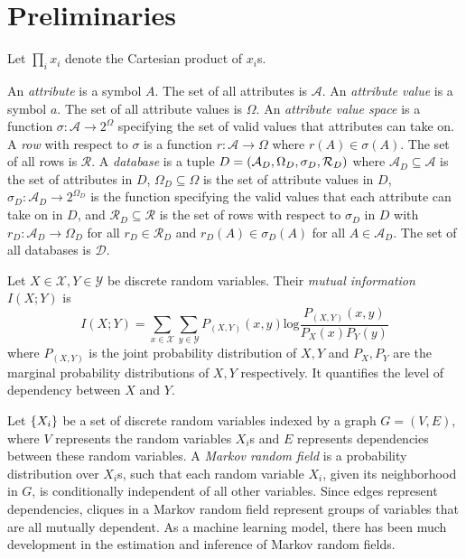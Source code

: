 \documentclass[manuscript,screen,review,anonymous]{acmart}
\DeclarePairedDelimiter{\set}{\{}{\}}
\DeclarePairedDelimiter{\tuple}{(}{)}
\renewcommand{\implies}{\rightarrow}
\newcommand{\db}{D}
\newcommand{\dbs}{\mathcal{D}}
\newcommand{\mi}[2]{I(#1;#2)}
\newcommand{\entropy}[1]{H(#1)}
\begin{document}
\section{Preliminaries}
\label{sec:prelim}

Let $\prod_i x_i$ denote the Cartesian product of $x_i$s.

An \emph{attribute} is a symbol $A$.
The set of all attributes is $\mathcal{A}$.
An \emph{attribute value} is a symbol $a$.
The set of all attribute values is $\Omega$.
An \emph{attribute value space} is a function $\sigma : \mathcal{A} \implies 2^{\Omega}$
specifying the set of valid values that attributes can take on.
A \emph{row} with respect to $\sigma$
is a function $r : \mathcal{A} \implies \Omega$
where $r(A) \in \sigma(A)$.
The set of all rows is $\mathcal{R}$.
A \emph{database} is a tuple $\db =
\tuple{
    \mathcal{A}_{\db},
    \Omega_{\db},
    \sigma_{\db},
    \mathcal{R}_{\db}
}$
where
$\mathcal{A}_{\db} \subseteq \mathcal{A}$
is the set of attributes in $\db$,
$\Omega_{\db} \subseteq \Omega$
is the set of attribute values in $\db$,
$\sigma_{\db} : \mathcal{A}_{\db} \implies 2^{\Omega_{\db}}$
is the function specifying the valid values that each attribute can take on in $\db$,
and $\mathcal{R}_{\db} \subseteq \mathcal{R}$
is the set of rows with respect to $\sigma_{\db}$ in $\db$
with $r_\db : \mathcal{A}_\db \implies \Omega_\db$
for all $r_\db \in \mathcal{R}_\db$
and $r_\db(A) \in \sigma_\db(A)$
for all $A \in \mathcal{A}_\db$.
The set of all databases is $\dbs$.

Let $X \in \mathcal{X},Y \in \mathcal{Y}$ be discrete random variables. Their \emph{mutual information} $\mi{X}{Y}$ is
\[
\mi{X}{Y} = \sum_{x \in \mathcal{X}} \sum_{y \in \mathcal{Y}} P_{(X,Y)}(x,y) \text{log} \frac{P_{(X,Y)}(x,y)}{P_X(x)P_Y(y)}
\]
where $P_{(X,Y)}$ is the joint probability distribution of $X,Y$ and $P_X,P_Y$ are the marginal probability distributions of $X,Y$ respectively.
It quantifies the level of dependency between $X$ and $Y$.

Let $\set{X_i}$ be a set of discrete random variables indexed by a graph $G = (V,E)$, where $V$ represents the random variables $X_i$s and $E$ represents dependencies between these random variables. A \emph{Markov random field} is a probability distribution over $X_i$s, such that each random variable $X_i$, given its neighborhood in $G$, is conditionally independent of all other variables. Since edges represent dependencies, cliques in a Markov random field represent groups of variables that are all mutually dependent. As a machine learning model, there has been much development in the estimation and inference of Markov random fields\cite{koller2009probabilistic,murphy2023probabilistic}.
\end{document}
